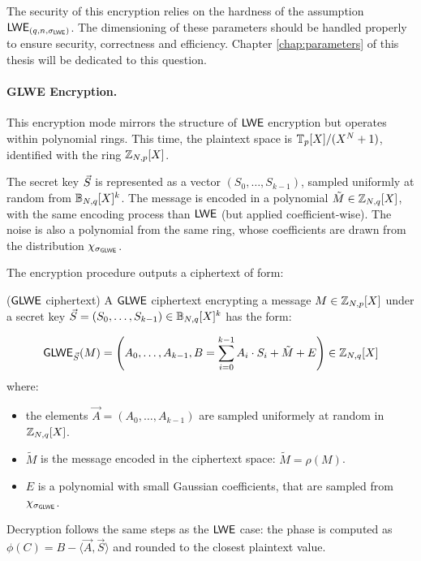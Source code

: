 The security of this encryption relies on the hardness of the assumption $\textsf{LWE}_{(q, n, \sigma_{\textsf{LWE}})}$. The dimensioning of these parameters should be handled properly to ensure security, correctness and efficiency. Chapter \ref{chap:parameters} of this thesis will be dedicated to this question.



\paragraph{GLWE Encryption.} This encryption mode mirrors the structure of $\textsf{LWE}$ encryption but operates within polynomial rings.
This time, the plaintext space is $\mathbb{T}_p[X] / (X^N + 1)$, identified with the ring $\mathbb{Z}_{N,p}[X]$.

The secret key $\vec S$ is represented as a vector $(S_0, \dots, S_{k-1})$, sampled uniformly at random from $\mathbb{B}_{N, q}[X]^k$. 
%
The message is encoded in a polynomial $\tilde M \in \mathbb{Z}_{N,q}[X]$, with the same encoding process than $\textsf{LWE}$ (but applied coefficient-wise). The noise is also a polynomial from the same ring, whose coefficients are drawn from the distribution $\chi_{\sigma_{\textsf{GLWE}}}$.
%

The encryption procedure outputs a ciphertext of form:


\begin{definition}($\textsf{GLWE}$ ciphertext)
	A $\textsf{GLWE}$ ciphertext encrypting a message $M \in \mathbb{Z}_{N,p}[X]$ under a secret key $\vec S = (S_0, \dots, S_{k-1}) \in \mathbb{B}_{N, q}[X]^k$ has the form:
	
	\begin{equation*}
		\textsf{GLWE}_{\vec S}(M) = \left ( A_0, \dots, A_{k-1}, B = \sum_{i=0}^{k-1} A_i \cdot S_i + \tilde M + E \right ) \in \mathbb{Z}_{N,q}[X]
	\end{equation*}
	where:
	\begin{itemize}
		\item the elements $\vec A = (A_0, \dots, A_{k-1})$ are sampled uniformely at random in $\mathbb{Z}_{N,q}[X]$.
		\item $\tilde M$ is the message encoded in the ciphertext space: $\tilde M = \rho(M)$.
		\item $E$ is a polynomial with small Gaussian coefficients, that are sampled from $\chi_{\sigma_{\textsf{GLWE}}}$.
	\end{itemize}
\end{definition}



Decryption follows the same steps as the $\textsf{LWE}$ case: the phase is computed as $\phi(C) = B - \langle \vec A, \vec S \rangle$ and rounded to the closest plaintext value.


